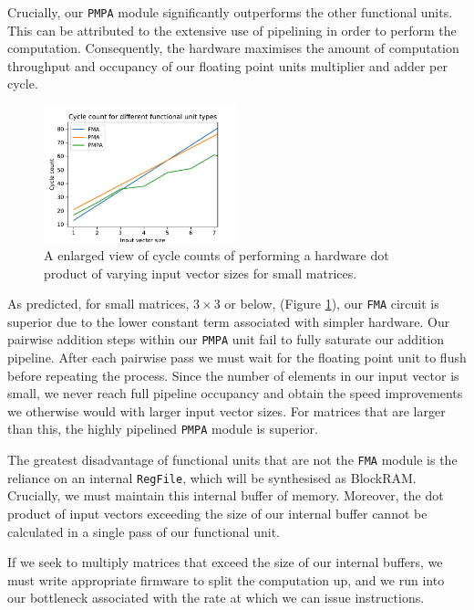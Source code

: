 \documentclass[a4paper,8pt]{report}
\begin{document}
Crucially, our \texttt{PMPA} module significantly outperforms the other
functional units. This can be attributed to the extensive use of pipelining in
order to perform the computation. Consequently, the hardware maximises the
amount of computation throughput and occupancy of our floating point units
multiplier and adder per cycle.

\begin{figure}[h]
  \centering
  \includegraphics[width=0.5\textwidth]{./py/c2_fut_zoom.pdf}
  \caption{A enlarged view of cycle counts of performing a hardware dot product of varying input
    vector sizes for small matrices.}
  \label{fig:c2_fut_zoom}
\end{figure}

As predicted, for small matrices, $3 \times 3$ or below, (Figure
\ref{fig:c2_fut_zoom}), our \texttt{FMA} circuit is superior due to the lower
constant term associated with simpler hardware. Our pairwise addition steps
within our \texttt{PMPA} unit fail to fully saturate our addition pipeline.
After each pairwise pass we must wait for the floating point unit to flush
before repeating the process. Since the number of elements in our input vector
is small, we never reach full pipeline occupancy and obtain the speed
improvements we otherwise would with larger input vector sizes. For matrices
that are larger than this, the highly pipelined \texttt{PMPA} module is
superior.

The greatest disadvantage of functional units that are not the \texttt{FMA}
module is the reliance on an internal \texttt{RegFile}, which will be
synthesised as BlockRAM. Crucially, we must maintain this internal buffer of
memory. Moreover, the dot product of input vectors exceeding the size of our
internal buffer cannot be calculated in a single pass of our functional unit.

If we seek to multiply matrices that exceed the size of our internal buffers, we
must write appropriate firmware to split the computation up, and we run into our
bottleneck associated with the rate at which we can issue instructions.
\end{document}
